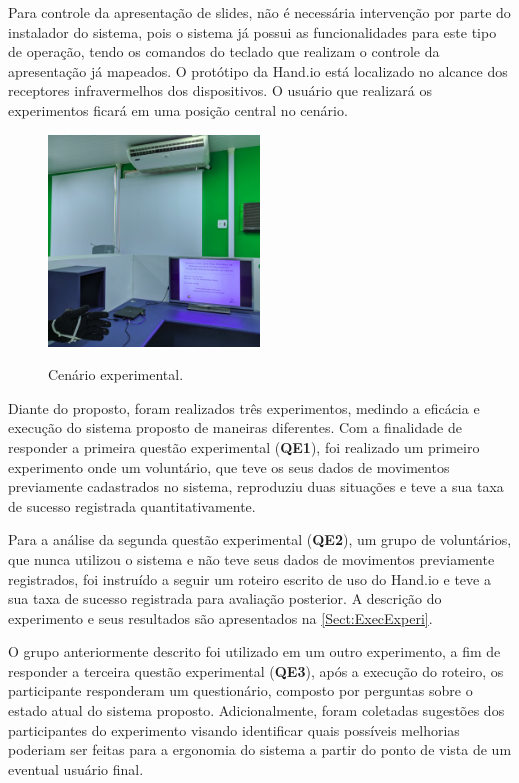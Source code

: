 Para controle da apresentação de slides, não é necessária intervenção por parte do instalador do sistema, pois o sistema já possui as funcionalidades para este tipo de operação, tendo os comandos do teclado que realizam o controle da apresentação já mapeados. O protótipo da Hand.io está localizado no alcance dos receptores infravermelhos dos dispositivos. O usuário que realizará os experimentos ficará em uma posição central no cenário.

\begin{figure}[ht]
    \centering
    \caption{Cenário experimental.}
    \includegraphics[width=0.5\textwidth, keepaspectratio]{resources/cenario.jpg}
    \label{fig:cenario}
\end{figure}

Diante do proposto, foram realizados três experimentos, medindo a eficácia e execução do sistema proposto de maneiras diferentes. Com a finalidade de responder a primeira questão experimental (\textbf{QE1}), foi realizado um primeiro experimento onde um voluntário, que teve os seus dados de movimentos previamente cadastrados no sistema, reproduziu duas situações e teve a sua taxa de sucesso registrada quantitativamente.

Para a análise da segunda questão experimental (\textbf{QE2}), um grupo de voluntários, que nunca utilizou o sistema e não teve seus dados de movimentos previamente registrados, foi instruído a seguir um roteiro escrito de uso do Hand.io e teve a sua taxa de sucesso registrada para avaliação posterior. A descrição do experimento e seus resultados são apresentados na \autoref{Sect:ExecExperi}. 

O grupo anteriormente descrito foi utilizado em um outro experimento, a fim de responder a terceira questão experimental (\textbf{QE3}), após a execução do roteiro, os participante responderam um questionário, composto por perguntas sobre o estado atual do sistema proposto. Adicionalmente, foram coletadas sugestões dos participantes do experimento visando identificar quais possíveis melhorias poderiam ser feitas para a ergonomia do sistema a partir do ponto de vista de um eventual usuário final.

